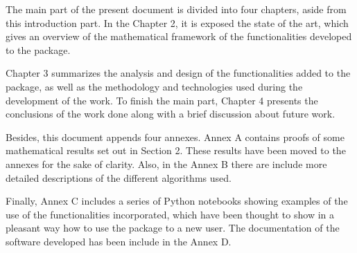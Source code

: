 The main part of the present document is divided into four chapters, aside from this introduction part. In the Chapter 2, it is exposed the state of the art, which gives an overview of the mathematical framework of the functionalities developed to the package.

Chapter 3 summarizes the analysis and design of the functionalities added to the package, as well as the methodology and technologies used during the development of the work. To finish the main part, Chapter 4 presents the conclusions of the work done along with a brief discussion about future work.

Besides, this document appends four annexes. Annex A contains proofs of some mathematical results set out in Section 2. These results have been moved to the annexes for the sake of clarity. Also, in the Annex B there are include more detailed descriptions of the different algorithms used.

Finally, Annex C includes a series of Python notebooks showing examples of the use of the functionalities incorporated, which have been thought to show in a pleasant way how to use the package to a new user. The documentation of the software developed has been include in the Annex D.
